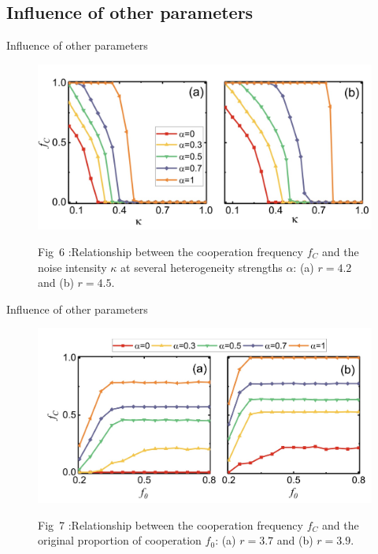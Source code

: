\documentclass[notheorems,11pt,compress]{beamer}
\numberwithin{figure}{section}
\numberwithin{table}{section}
\numberwithin{equation}{section}
\theoremstyle{plain}
\numberwithin{theorem}{section}
\numberwithin{definition}{section}
\numberwithin{lemma}{section}
\numberwithin{proposition}{section}
\numberwithin{corollary}{section}
\theoremstyle{example}
\begin{document}
\subsection{Influence of other parameters
}
\begin{frame}{Influence of other parameters}

	\begin{figure}[H]
		\centering
		\includegraphics[width=1\linewidth]{6}
		\label{fig6}
		\parbox{.8\textwidth}{\scriptsize Fig\ 6 :Relationship between the cooperation frequency $f_C$ and the noise intensity $\kappa$ at several heterogeneity strengths $\alpha$: (a) $r = 4.2$ and (b) $r = 4.5$.}
	\end{figure}
\end{frame}


\begin{frame}{Influence of other parameters}

	\begin{figure}[H]
		\centering
		\includegraphics[width=1\linewidth]{7}
		\label{fig7}
		\parbox{.8\textwidth}{\scriptsize Fig\ 7 :Relationship between the cooperation frequency $f_C$ and the original proportion of cooperation $f_0$: (a) $r = 3.7$ and (b) $r = 3.9$.}
	\end{figure}
\end{frame}
\end{document}
